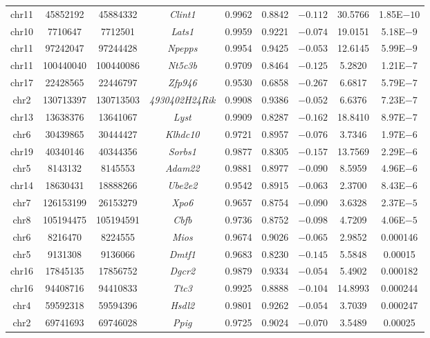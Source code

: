 \begin{table}[!htbp]
\begin{tabular}{@{\extracolsep{5pt}} ccccccccc}
	chr11 & 45852192 & 45884332 & \textit{Clint1} & 0.9962 & 0.8842 & $-0.112$ & 30.5766 & 1.85E$-10$ \\ 
	chr10 & 7710647 & 7712501 & \textit{Lats1} & 0.9959 & 0.9221 & $-0.074$ & 19.0151 & 5.18E$-9$\\ 
	chr11 & 97242047 & 97244428 & \textit{Npepps} & 0.9954 & 0.9425 & $-0.053$ & 12.6145 & 5.99E$-9$\\ 
	chr11 & 100440040 & 100440086 & \textit{Nt5c3b} & 0.9709 & 0.8464 & $-0.125$ & 5.2820 & 1.21E$-7$\\ 
	chr17 & 22428565 & 22446797 & \textit{Zfp946} & 0.9530 & 0.6858 & $-0.267$ & 6.6817 & 5.79E$-7$ \\ 
	chr2 & 130713397  & 130713503& \textit{4930402H24Rik} & 0.9908 & 0.9386 & $-0.052$ & 6.6376 & 7.23E$-7$ \\ 
	chr13 & 13638376 & 13641067 & \textit{Lyst} & 0.9909 & 0.8287 & $-0.162$ & 18.8410 & 8.97E$-7$\\ 
	chr6 & 30439865 & 30444427 & \textit{Klhdc10} & 0.9721 & 0.8957 & $-0.076$ & 3.7346 & 1.97E$-6$\\ 
	chr19 & 40340146 & 40344356 & \textit{Sorbs1} & 0.9877 & 0.8305 & $-0.157$ & 13.7569 & 2.29E$-6$\\ 
	chr5 & 8143132 & 8145553 & \textit{Adam22} & 0.9881 & 0.8977 & $-0.090$ & 8.5959 & 4.96E$-6$ \\ 
	chr14 & 18630431 & 18888266 & \textit{Ube2e2} & 0.9542 & 0.8915 & $-0.063$ & 2.3700 & 8.43E$-6$\\ 
	chr7 & 126153199 & 26153279 & \textit{Xpo6} & 0.9657 & 0.8754 & $-0.090$ & 3.6328 & 2.37E$-5$ \\ 
	chr8 &  105194475 & 105194591 & \textit{Cbfb} & 0.9736 & 0.8752 & $-0.098$ & 4.7209 & 4.06E$-5$ \\ 
	chr6 & 8216470 & 8224555 & \textit{Mios} & 0.9674 & 0.9026 & $-0.065$ & 2.9852 & 0.000146 \\ 
	chr5 & 9131308 & 9136066 & \textit{Dmtf1} & 0.9683 & 0.8230 & $-0.145$ & 5.5848 & 0.00015 \\ 
	chr16 & 17845135 & 17856752 & \textit{Dgcr2} & 0.9879 & 0.9334 & $-0.054$ & 5.4902 & 0.000182 \\ 
	chr16 & 94408716 & 94410833 & \textit{Ttc3} & 0.9925 & 0.8888 & $-0.104$ & 14.8993 & 0.000244 \\ 
	chr4 & 59592318 & 59594396 & \textit{Hsdl2} & 0.9801 & 0.9262 & $-0.054$ & 3.7039 & 0.000247 \\ 
	chr2 & 69741693 & 69746028 & \textit{Ppig} & 0.9725 & 0.9024 & $-0.070$ & 3.5489 & 0.00025 \\ 

\end{tabular}
\end{table}
